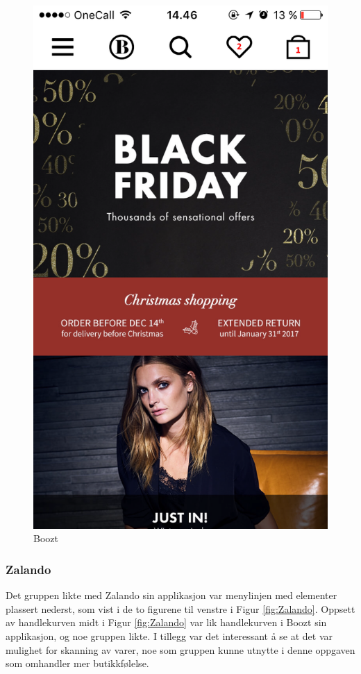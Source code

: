 \begin{figure}[H]
\includegraphics[scale=0.2]{images/inspiration/image3}
\centering %
\caption{Boozt}
\label{fig:Boozt}
\end{figure}

\subsubsection{Zalando}
\label{zalando}
Det gruppen likte med Zalando sin applikasjon var menylinjen med elementer plassert nederst, som vist i de to figurene til venstre i Figur \ref{fig:Zalando}. Oppsett av handlekurven midt i Figur \ref{fig:Zalando} var lik handlekurven i Boozt sin applikasjon, og noe gruppen likte. I tillegg var det interessant å se at det var mulighet for skanning av varer, noe som gruppen kunne utnytte i denne oppgaven som omhandler mer butikkfølelse. 

